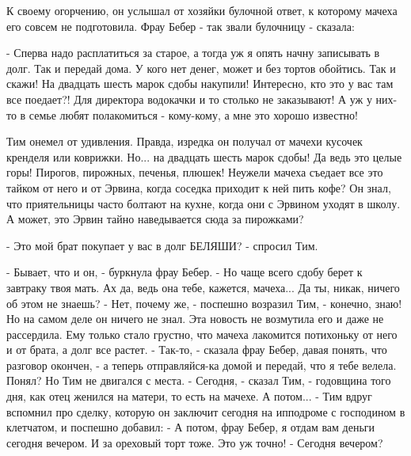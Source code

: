  
 
 
 
 

К своему огорчению, он услышал от хозяйки булочной ответ, к которому мачеха его
совсем не подготовила. Фрау Бебер - так звали булочницу - сказала:

- Сперва надо расплатиться за старое, а тогда уж я опять начну записывать в
долг. Так и передай дома. У кого нет денег, может и без тортов обойтись. Так и
скажи! На двадцать шесть марок сдобы накупили! Интересно, кто это у вас там все
поедает?! Для директора водокачки и то столько не заказывают! А уж у них-то в
семье любят полакомиться - кому-кому, а мне это хорошо известно!

Тим онемел от удивления. Правда, изредка он получал от мачехи кусочек кренделя
или коврижки. Но... на двадцать шесть марок сдобы! Да ведь это целые горы!
Пирогов, пирожных, печенья, плюшек! Неужели мачеха съедает все это тайком от
него и от Эрвина, когда соседка приходит к ней пить кофе? Он знал, что
приятельницы часто болтают на кухне, когда они с Эрвином уходят в школу. А
может, это Эрвин тайно наведывается сюда за пирожками?

- Это мой брат покупает у вас в долг БЕЛЯШИ? - спросил Тим.

      - Бывает, что и он, - буркнула фрау Бебер. - Но чаще всего сдобу берет к завтраку твоя мать. Ах да, ведь она тебе, кажется, мачеха... Да ты, никак, ничего об этом не знаешь?
      - Нет, почему же, - поспешно возразил Тим, - конечно, знаю!
      Но на самом деле он ничего не знал. Эта новость не возмутила его и даже не рассердила. Ему только стало грустно, что мачеха лакомится потихоньку от него и от брата, а долг все растет.
      - Так-то, - сказала фрау Бебер, давая понять, что разговор окончен, - а теперь отправляйся-ка домой и передай, что я тебе велела. Понял? Но Тим не двигался с места.
      - Сегодня, - сказал Тим, - годовщина того дня, как отец женился на матери, то есть на мачехе. А потом... - Тим вдруг вспомнил про сделку, которую он заключит сегодня на ипподроме с господином в клетчатом, и поспешно добавил: - А потом, фрау Бебер, я отдам вам деньги сегодня вечером. И за ореховый торт тоже. Это уж точно!
      - Сегодня вечером? 
